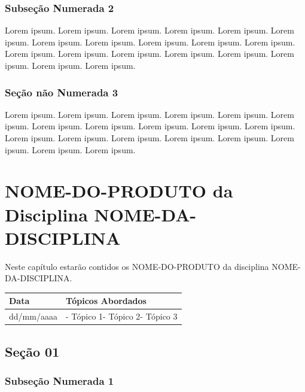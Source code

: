 \documentclass[
]{book}
\begin{document}
\hypertarget{subseuxe7uxe3o-numerada-2-1}{%
\subsection{Subseção Numerada 2}\label{subseuxe7uxe3o-numerada-2-1}}

Lorem ipsum. Lorem ipsum. Lorem ipsum. Lorem ipsum. Lorem ipsum. Lorem ipsum. Lorem ipsum. Lorem ipsum. Lorem ipsum. Lorem ipsum. Lorem ipsum. Lorem ipsum. Lorem ipsum. Lorem ipsum. Lorem ipsum. Lorem ipsum. Lorem ipsum. Lorem ipsum. Lorem ipsum.

\hypertarget{seuxe7uxe3o-nuxe3o-numerada-3-1}{%
\subsection*{Seção não Numerada 3}\label{seuxe7uxe3o-nuxe3o-numerada-3-1}}

Lorem ipsum. Lorem ipsum. Lorem ipsum. Lorem ipsum. Lorem ipsum. Lorem ipsum. Lorem ipsum. Lorem ipsum. Lorem ipsum. Lorem ipsum. Lorem ipsum. Lorem ipsum. Lorem ipsum. Lorem ipsum. Lorem ipsum. Lorem ipsum. Lorem ipsum. Lorem ipsum. Lorem ipsum.

\hypertarget{nome-do-produto-da-disciplina-nome-da-disciplina-1}{%
\chapter{NOME-DO-PRODUTO da Disciplina NOME-DA-DISCIPLINA}\label{nome-do-produto-da-disciplina-nome-da-disciplina-1}}

Neste capítulo estarão contidos os NOME-DO-PRODUTO da disciplina NOME-DA-DISCIPLINA.

\begin{longtable}[]{@{}ll@{}}
\toprule()
Data & Tópicos Abordados \\
\midrule()
\endhead
dd/mm/aaaa & - Tópico 1- Tópico 2- Tópico 3 \\
\bottomrule()
\end{longtable}

\hypertarget{seuxe7uxe3o-01-1}{%
\section{Seção 01}\label{seuxe7uxe3o-01-1}}

\hypertarget{subseuxe7uxe3o-numerada-1-2}{%
\subsection{Subseção Numerada 1}\label{subseuxe7uxe3o-numerada-1-2}}
\end{document}
